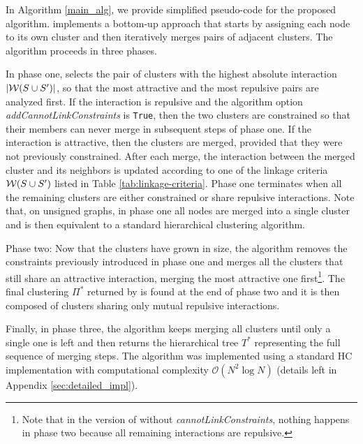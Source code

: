 In Algorithm \ref{main_alg}, we provide simplified pseudo-code for the proposed \algname{} algorithm. \algname{} implements a bottom-up approach that starts by assigning each node to its own cluster and then iteratively merges pairs of adjacent clusters. The algorithm proceeds in three phases. 

In phase one, \algname{} selects the pair of clusters with the highest absolute interaction $|\mathcal{W}(S  \cup  S')|$, so that the most attractive and the most repulsive pairs are analyzed first. If the interaction is repulsive and the algorithm option \emph{addCannotLinkConstraints} is \texttt{True}, then the two clusters are constrained so that their members can never merge in subsequent steps of phase one. If the interaction is attractive, then the clusters are merged, provided that they were not previously constrained. 
After each merge, the interaction between the merged cluster and its neighbors is updated according to one of the linkage criteria $\mathcal{W}(S \cup  S')$ listed in Table \ref{tab:linkage-criteria}. Phase one terminates when all the remaining clusters are either constrained or share repulsive interactions. Note that, on unsigned graphs, in phase one all nodes are merged into a single cluster and \algname{} is then equivalent to a standard hierarchical clustering algorithm.

Phase two: Now that the clusters have grown in size, the algorithm removes the constraints previously introduced in phase one and merges all the clusters that still share an attractive interaction, merging the most attractive one first\footnote{Note that in the version of \algname{} without \emph{cannotLinkConstraints}, nothing happens in phase two because all remaining interactions are repulsive.}. The final clustering $\Pi^*$ returned by \algname{} is found at the end of phase two and it is then composed of clusters sharing only mutual repulsive interactions. 

Finally, in phase three, the algorithm keeps merging all clusters until only a single one is left and then returns the hierarchical tree $T^*$ representing the full sequence of merging steps.
The algorithm was implemented using a standard HC implementation with computational complexity $\mathcal{O}(N^2 \log N)$ (details left in Appendix \ref{sec:detailed_impl}). 



